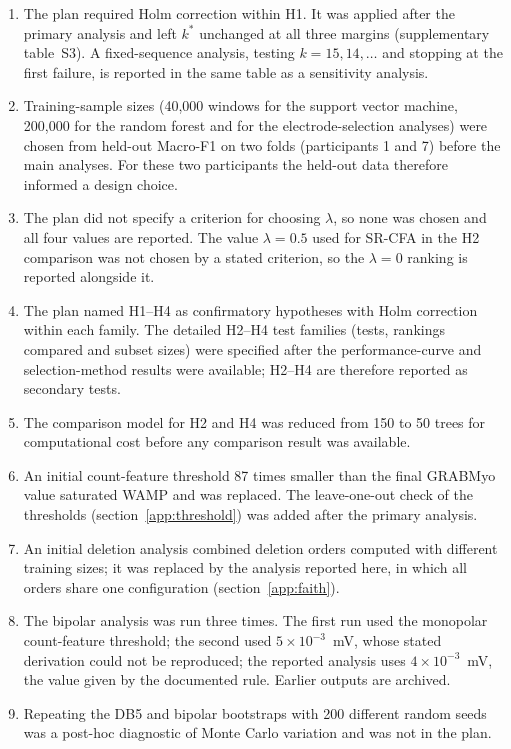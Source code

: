 \documentclass{iopjournal}
\newif\ifshowchanges
\newcommand{\chg}[1]{\ifshowchanges{\color{blue}#1}\else{#1}\fi}
\begin{document}
\begin{enumerate}
\item The plan required Holm correction within H1. It was applied after the primary analysis and left $k^*$ unchanged at all three margins (supplementary table~S3). A fixed-sequence analysis, testing $k = 15, 14, \ldots$ and stopping at the first failure, is reported in the same table as a sensitivity analysis.
\item Training-sample sizes (40,000 windows for the support vector machine, 200,000 for the random forest and for the electrode-selection analyses) were chosen from held-out Macro-F1 on two folds (participants 1 and 7) before the main analyses. For these two participants the held-out data therefore informed a design choice.
\item The plan did not specify a criterion for choosing $\lambda$, so none was chosen and all four values are reported. The value $\lambda = 0.5$ used for SR-CFA in the H2 comparison was not chosen by a stated criterion, so the $\lambda = 0$ ranking is reported alongside it.
\item The plan named H1--H4 as confirmatory hypotheses with Holm correction within each family. The detailed H2--H4 test families (tests, rankings compared and subset sizes) were specified after the performance-curve and selection-method results were available; H2--H4 are therefore reported as secondary tests.
\item The comparison model for H2 and H4 was reduced from 150 to 50 trees for computational cost before any comparison result was available.
\item An initial count-feature threshold 87 times smaller than the final GRABMyo value saturated WAMP and was replaced. The leave-one-out check of the thresholds (section~\ref{app:threshold}) was added after the primary analysis.
\item An initial deletion analysis combined deletion orders computed with different training sizes; it was replaced by the analysis reported here, in which all orders share one configuration (section~\ref{app:faith}).
\item The bipolar analysis was run three times. The first run used the monopolar count-feature threshold; the second used $5 \times 10^{-3}$~mV, whose stated derivation could not be reproduced; the reported analysis uses $4 \times 10^{-3}$~mV, the value given by the documented rule. Earlier outputs are archived.
\item \chg{Repeating the DB5 and bipolar bootstraps with 200 different random seeds was a post-hoc diagnostic of Monte Carlo variation and was not in the plan.}

\end{enumerate}
\end{document}

